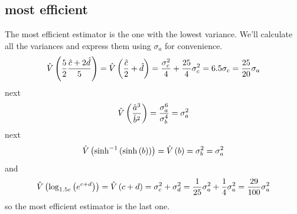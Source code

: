 \subsection{most efficient}
The most efficient estimator is the one with the lowest variance. We'll calculate all the variances and express them using \(\sigma_a\) for convenience.
\begin{align}
    \hat{V}\left(\frac{5}{2}\frac{\hat{c}+2\hat{d}}{5}\right) = \hat{V}\left(\frac{\hat{c}}{2}+\hat{d}\right)=\frac{\sigma_c^2}{4}+\frac{25}{4}\sigma_c^2 = 6.5\sigma_c = \frac{25}{20}\sigma_a
\end{align}
next 
\begin{equation}
    \hat{V}\left(\frac{\hat{a}^3}{\hat{b}^2}\right) = \frac{\sigma_a^6}{\sigma_b^4}=\sigma_a^2
\end{equation}
next
\begin{equation}
    \hat{V}\left(\sinh^{-1}\left(\sinh\left(b\right)\right)\right) = \hat{V}\left(b\right)=\sigma_b^2 = \sigma_a^2
\end{equation}
and 
\begin{equation}
    \hat{V}\left(\log_{1.5e}\left(e^{c+d}\right)\right) = \hat{V}\left(c+d\right) = \sigma_c^2+\sigma_d^2 = \frac{1}{25}\sigma_a^2+\frac{1}{4}\sigma_a^2 = \frac{29}{100}\sigma_a^2
\end{equation}
so the most efficient estimator is the last one.